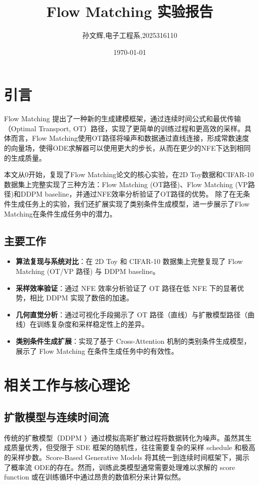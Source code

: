 \documentclass[11pt,a4paper]{article}
\title{\textbf{Flow Matching 实验报告}}
\author{孙文辉,电子工程系,2025316110}
\date{\today}
\begin{document}
\maketitle


\section{引言}
\label{sec:introduction}

Flow Matching \cite{lipman2023flow}提出了一种新的生成建模框架，通过连续时间公式和最优传输（Optimal Transport, OT）路径，实现了更简单的训练过程和更高效的采样。具体而言，Flow Matching使用OT路径将噪声和数据通过直线连接，形成常数速度的向量场，使得ODE求解器可以使用更大的步长，从而在更少的NFE下达到相同的生成质量。

本文从0开始，复现了Flow Matching论文的核心实验，在2D Toy数据和CIFAR-10数据集上完整实现了三种方法：Flow Matching (OT路径)、Flow Matching (VP路径)和DDPM baseline，并通过NFE效率分析验证了OT路径的优势。
除了在无条件生成任务上的实验，我们还扩展实现了类别条件生成模型，进一步展示了Flow Matching在条件生成任务中的潜力。
\subsection{主要工作}
\begin{itemize}
\item \textbf{算法复现与系统对比}：在 2D Toy 和 CIFAR-10 数据集上完整复现了 Flow Matching (OT/VP 路径) 与 DDPM baseline。
\item \textbf{采样效率验证}：通过 NFE 效率分析验证了 OT 路径在低 NFE 下的显著优势，相比 DDPM 实现了数倍的加速。
\item \textbf{几何直觉分析}：通过可视化手段揭示了 OT 路径（直线）与扩散模型路径（曲线）在训练复杂度和采样稳定性上的差异。
\item \textbf{类别条件生成扩展}：实现了基于 Cross-Attention 机制的类别条件生成模型，展示了 Flow Matching 在条件生成任务中的有效性。
\end{itemize}

\section{相关工作与核心理论}
\label{sec:related_work}

\subsection{扩散模型与连续时间流}

传统的扩散模型（DDPM \cite{ho2020denoising}）通过模拟高斯扩散过程将数据转化为噪声。虽然其生成质量优秀，但受限于 SDE 框架的随机性，往往需要复杂的采样 schedule 和极高的采样步数。Score-Based Generative Models \cite{song2021score} 将其统一到连续时间框架下，揭示了概率流 ODE的存在。然而，训练此类模型通常需要处理难以求解的 score function 或在训练循环中通过昂贵的数值积分来计算似然。
\end{document}
